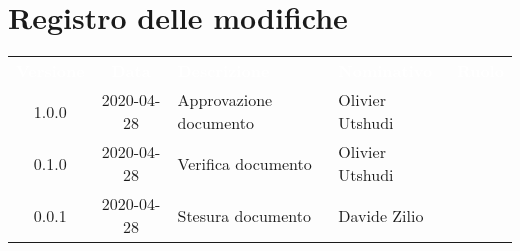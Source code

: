 \section*{Registro delle modifiche}
{
	\centering
	\begin{longtable}{ c c C{4cm}  C{4cm}  C{3cm} }
		\textcolor{white}{\textbf{Versione}} & \textcolor{white}{\textbf{Data}} & \textcolor{white}{\textbf{Descrizione}} & \textcolor{white}{\textbf{Nominativo}} & \textcolor{white}{\textbf{Ruolo}}\\		
		1.0.0 & 2020-04-28 & Approvazione documento & Olivier Utshudi &\RdP{}\\		
		0.1.0 & 2020-04-28 & Verifica documento & Olivier Utshudi &\ver{}\\		
		0.0.1 & 2020-04-28 & Stesura documento & Davide Zilio &\reda{}\\		
		
	\end{longtable}

}